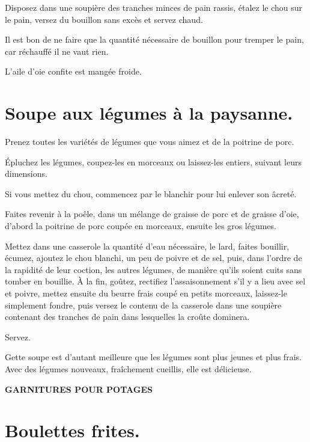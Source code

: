 Disposez dans une soupière des tranches minces de pain rassis, étalez le chou
sur le pain, versez du bouillon sans excès et servez chaud.

Il est bon de ne faire que la quantité nécessaire de bouillon pour tremper le
pain, car réchauffé il ne vaut rien.

L'aile d'oie confite est mangée froide.

\section*{\centering Soupe aux légumes à la paysanne.}

Prenez toutes les variétés de légumes que vous aimez et de la poitrine de porc.

Épluchez les légumes, coupez-les en morceaux ou laissez-les entiers, suivant
leurs dimensions.

Si vous mettez du chou, commencez par le blanchir pour lui enlever son âcreté.

Faites revenir à la poêle, dans un mélange de graisse de porc et de graisse
d'oie, d'abord la poitrine de porc coupée en morceaux, ensuite les gros
légumes.

Mettez dans une casserole la quantité d'eau nécessaire, le lard, faites
bouillir, écumez, ajoutez le chou blanchi, un peu de poivre et de sel, puis,
dans l'ordre de la rapidité de leur coction, les autres légumes, de manière
qu'ils soient cuits sans tomber en bouillie. À la fin, goûtez, rectifiez
l'assaisonnement s'il y a lieu avec sel et poivre, mettez ensuite du beurre
frais coupé en petits morceaux, laissez-le simplement fondre, puis versez le
contenu de la casserole dans une soupière contenant des tranches de pain dans
lesquelles la croûte dominera.

Servez.

Gette soupe est d'autant meilleure que les légumes sont plus jeunes et plus
frais. Avec des légumes nouveaux, fraîchement cueillis, elle est délicieuse.

\sk

\newpage
\medskip

\centering\textbf{\large GARNITURES POUR POTAGES}

\smallskip

\section*{\centering Boulettes frites.}

